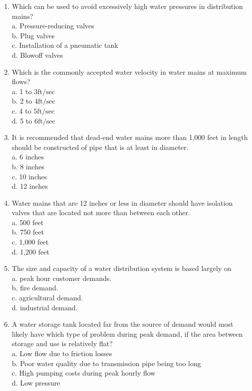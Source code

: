 \documentclass[10pt]{article}
\begin{document}
\begin{enumerate}
  \item Which can be used to avoid excessively high water pressures in distribution mains?\\
a. Pressure-reducing valves\\
b. Plug valves\\
c. Installation of a pneumatic tank\\
d. Blowoff valves

  \item Which is the commonly accepted water velocity in water mains at maximum flows?\\
a. 1 to $3 \mathrm{ft} / \mathrm{sec}$\\
b. 2 to $4 \mathrm{ft} / \mathrm{sec}$\\
c. 4 to $5 \mathrm{ft} / \mathrm{sec}$\\
d. 5 to $6 \mathrm{ft} / \mathrm{sec}$

  \item It is recommended that dead-end water mains more than 1,000 feet in length should be constructed of pipe that is at least in diameter.\\
a. 6 inches\\
b. 8 inches\\
c. 10 inches\\
d. 12 inches

  \item Water mains that are 12 inches or less in diameter should have isolation valves that are located not more than between each other.\\
a. 500 feet\\
b. 750 feet\\
c. 1,000 feet\\
d. 1,200 feet

  \item The size and capacity of a water distribution system is based largely on\\
a. peak hour customer demands.\\
b. fire demand.\\
c. agricultural demand.\\
d. industrial demand.

  \item A water storage tank located far from the source of demand would most likely have which type of problem during peak demand, if the area between storage and use is relatively flat?\\
a. Low flow due to friction losses\\
b. Poor water quality due to transmission pipe being too long\\
c. High pumping costs during peak hourly flow\\
d. Low pressure


\end{enumerate}
\end{document}
